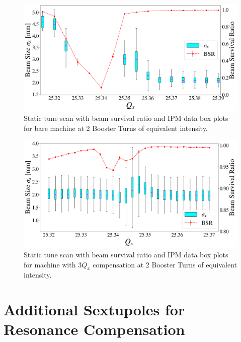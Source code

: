 \begin{figure}[H]
    \centering
    \includegraphics[width=\columnwidth]{chapter4/static2turns_ipm.png}
    \caption{Static tune scan with beam survival ratio and IPM data box plots for bare machine at 2 Booster Turns of equivalent intensity.}
    \label{fig:static2_ipm}
\end{figure}

\begin{figure}[H]
    \centering
    \includegraphics[width=\columnwidth]{chapter4/static2turns_comp_ipm_dampersOFF.png}
    \caption{Static tune scan with beam survival ratio and IPM data box plots for machine with $3Q_x$ compensation at 2 Booster Turns of equivalent intensity.}
    \label{fig:static2_ipm_comp}
\end{figure}

\section{Additional Sextupoles for Resonance Compensation}
\label{sec:addsexts}

